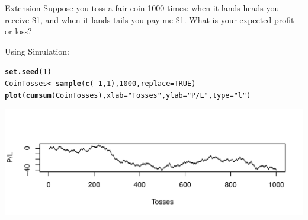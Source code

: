 \documentclass[t,xcolor=pdftex,dvipsnames,table]{beamer}
\makeatletter
\def\maxwidth{ %
  \ifdim\Gin@nat@width>\linewidth
    \linewidth
  \else
    \Gin@nat@width
  \fi
}
\newcommand{\hlnum}[1]{\textcolor[rgb]{0.686,0.059,0.569}{#1}}%
\newcommand{\hlstr}[1]{\textcolor[rgb]{0.192,0.494,0.8}{#1}}%
\newcommand{\hlopt}[1]{\textcolor[rgb]{0,0,0}{#1}}%
\newcommand{\hlstd}[1]{\textcolor[rgb]{0.345,0.345,0.345}{#1}}%
\newcommand{\hlkwb}[1]{\textcolor[rgb]{0.69,0.353,0.396}{#1}}%
\newcommand{\hlkwc}[1]{\textcolor[rgb]{0.333,0.667,0.333}{#1}}%
\newcommand{\hlkwd}[1]{\textcolor[rgb]{0.737,0.353,0.396}{\textbf{#1}}}%
\newenvironment{kframe}{%
 \def\at@end@of@kframe{}%
 \ifinner\ifhmode%
  \def\at@end@of@kframe{\end{minipage}}%
  \begin{minipage}{\columnwidth}%
 \fi\fi%
 \def\FrameCommand##1{\hskip\@totalleftmargin \hskip-\fboxsep
 \colorbox{shadecolor}{##1}\hskip-\fboxsep
     \hskip-\linewidth \hskip-\@totalleftmargin \hskip\columnwidth}%
 \MakeFramed {\advance\hsize-\width
   \@totalleftmargin\z@ \linewidth\hsize
   \@setminipage}}%
 {\par\unskip\endMakeFramed%
 \at@end@of@kframe}
\newenvironment{knitrout}{}{} %
\makeatother
\begin{document}
\begin{frame}[fragile]{}
\begin{alertblock}{Extension}
Suppose you toss a fair coin 1000 times:  when it lands heads
you receive \$1, and when it lands tails you pay me \$1.
What is your expected profit or loss?
\end{alertblock}

Using Simulation:
\begin{knitrout}
\color{fgcolor}\begin{kframe}
\begin{alltt}
\hlkwd{set.seed}\hlstd{(}\hlnum{1}\hlstd{)}
\hlstd{CoinTosses} \hlkwb{<-} \hlkwd{sample}\hlstd{(}\hlkwd{c}\hlstd{(}\hlopt{-}\hlnum{1}\hlstd{,}\hlnum{1}\hlstd{),} \hlnum{1000}\hlstd{,} \hlkwc{replace} \hlstd{=} \hlnum{TRUE}\hlstd{)}
\hlkwd{plot}\hlstd{(}\hlkwd{cumsum}\hlstd{(CoinTosses),}\hlkwc{xlab}\hlstd{=}\hlstr{"Tosses"}\hlstd{,} \hlkwc{ylab}\hlstd{=}\hlstr{"P/L"}\hlstd{,} \hlkwc{type}\hlstd{=}\hlstr{"l"}\hlstd{)}
\end{alltt}
\end{kframe}
\includegraphics[width=\maxwidth]{figure/unnamed-chunk-3-1} 

\end{knitrout}
\end{frame}
\end{document}
